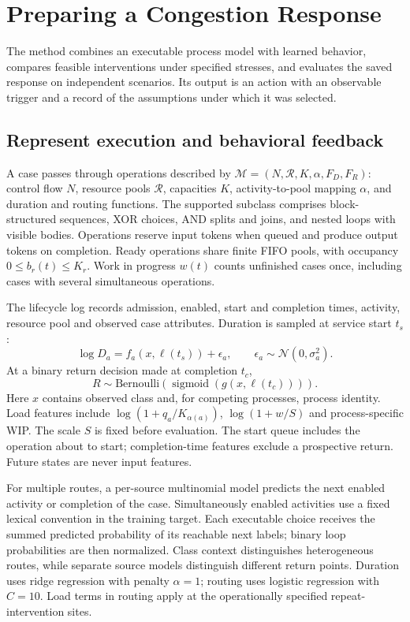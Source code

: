 \section{Preparing a Congestion Response}
The method combines an executable process model with learned behavior, compares feasible interventions under specified stresses, and evaluates the saved response on independent scenarios. Its output is an action with an observable trigger and a record of the assumptions under which it was selected.

\subsection{Represent execution and behavioral feedback}
A case passes through operations described by $\mathcal M=(N,\mathcal R,K,\alpha,F_D,F_R)$: control flow $N$, resource pools $\mathcal R$, capacities $K$, activity-to-pool mapping $\alpha$, and duration and routing functions. The supported subclass comprises block-structured sequences, XOR choices, AND splits and joins, and nested loops with visible bodies. Operations reserve input tokens when queued and produce output tokens on completion. Ready operations share finite FIFO pools, with occupancy $0\leq b_r(t)\leq K_r$. Work in progress $w(t)$ counts unfinished cases once, including cases with several simultaneous operations.

The lifecycle log records admission, enabled, start and completion times, activity, resource pool and observed case attributes. Duration is sampled at service start $t_s$:
\begin{equation}\label{eq:duration}
\log D_a=f_a(x,\ell(t_s))+\epsilon_a,\qquad \epsilon_a\sim\mathcal N(0,\sigma_a^2).
\end{equation}
At a binary return decision made at completion $t_c$,
\begin{equation}\label{eq:return}
R\sim\mathrm{Bernoulli}\!\left(\operatorname{sigmoid}(g(x,\ell(t_c)))\right).
\end{equation}
Here $x$ contains observed class and, for competing processes, process identity. Load features include $\log(1+q_a/K_{\alpha(a)})$, $\log(1+w/S)$ and process-specific WIP. The scale $S$ is fixed before evaluation. The start queue includes the operation about to start; completion-time features exclude a prospective return. Future states are never input features.

For multiple routes, a per-source multinomial model predicts the next enabled activity or completion of the case. Simultaneously enabled activities use a fixed lexical convention in the training target. Each executable choice receives the summed predicted probability of its reachable next labels; binary loop probabilities are then normalized. Class context distinguishes heterogeneous routes, while separate source models distinguish different return points. Duration uses ridge regression with penalty $\alpha=1$; routing uses logistic regression with $C=10$. Load terms in routing apply at the operationally specified repeat-intervention sites.

